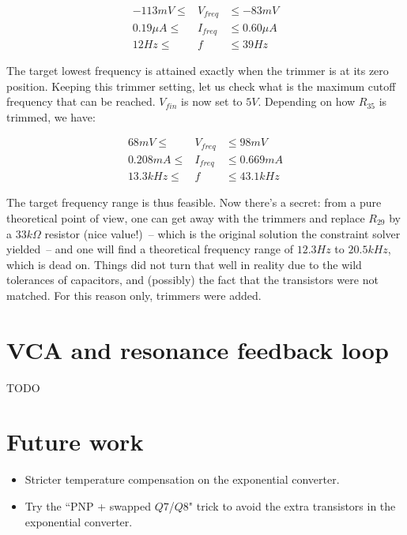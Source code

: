 \documentclass[a4paper,11pt]{article}
\begin{document}
\begin{eqnarray}
-113mV \leq &V_{freq}& \leq -83mV \\
0.19\mu A \leq &I_{freq}& \leq 0.60\mu A \\
12Hz \leq &f& \leq 39Hz
\end{eqnarray}

The target lowest frequency is attained exactly when the trimmer is at its zero position. Keeping this trimmer setting, let us check what is the maximum cutoff frequency that can be reached. $V_{fin}$ is now set to $5V$. Depending on how $R_{35}$ is trimmed, we have:

\begin{eqnarray}
68mV \leq &V_{freq}& \leq 98mV \\
0.208 mA \leq &I_{freq}& \leq 0.669 mA \\
13.3kHz \leq &f& \leq 43.1kHz
\end{eqnarray}

The target frequency range is thus feasible. Now there's a secret: from a pure theoretical point of view, one can get away with the trimmers and replace $R_{29}$ by a $33k\Omega$ resistor (nice value!)~-- which is the original solution the constraint solver yielded~-- and one will find a theoretical frequency range of $12.3 Hz$ to $20.5kHz$, which is dead on. Things did not turn that well in reality due to the wild tolerances of capacitors, and (possibly) the fact that the transistors were not matched. For this reason only, trimmers were added.

\section{VCA and resonance feedback loop}
\label{sec:vca}

TODO

\section{Future work}

\begin{itemize}
\item Stricter temperature compensation on the exponential converter.
\item Try the ``PNP + swapped $Q7$/$Q8$" trick to avoid the extra transistors in the exponential converter.
\end{itemize}
\end{document}
